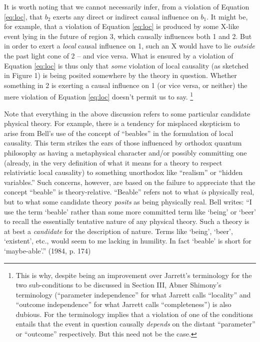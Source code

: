 \documentclass[aps,prc,twocolumn]{revtex4}
\begin{document}
It is worth noting that we cannot necessarily infer, from a violation
of Equation \ref{eq:loc}, that $b_2$ exerts any direct or indirect
causal influence on $b_1$.  It might be, for example,
that a violation of Equation \ref{eq:loc} is produced by some X-like
event lying in the future of region 3, which causally
influences both 1 and 2.  But in order to exert a \emph{local} causal
influence on 1, such an X would have to lie \emph{outside} the past light
cone of 2 -- and vice versa.  What is ensured by a violation of Equation
\ref{eq:loc} is thus only that \emph{some} violation of local
causality (as sketched in Figure 1) is being posited somewhere by the
theory in question.  Whether something in 2 is exerting a causal
influence on 1 (or vice versa, or neither) the mere violation of
Equation \ref{eq:loc} doesn't permit us to say.  
\footnote{This is why, despite being an improvement over Jarrett's
  terminology for the two sub-conditions to be discussed in Section
  III, Abner Shimony's terminology (``parameter independence'' for
  what Jarrett calls ``locality'' and ``outcome independence'' for
  what Jarrett calls ``completeness'') is also dubious.  For the
  terminology implies that a violation of one of the conditions
  entails that the event in question causally \emph{depends} on the distant
  ``parameter'' or ``outcome'' respectively.  But this need not be the
  case.}

Note that
everything in the above discussion refers to some particular candidate
physical theory.  For example, there is a tendency for misplaced
skepticism to arise from Bell's use of the concept of ``beables'' in 
the formulation of local causality.  This term strikes the ears of
those influenced by orthodox quantum philosophy as having a
metaphysical character and/or possibly committing one (already, in the
very definition of what it means for a theory to respect relativistic
local causality) to something unorthodox like ``realism'' or ``hidden
variables.''  Such concerns, however, are based on the failure to 
appreciate that
the concept ``beable'' is theory-relative.  ``Beable'' refers not to
what \emph{is} physically real, but to what some candidate theory
\emph{posits} as being physically real.  Bell writes:
``I use the term
`beable' rather than some more committed term like `being' or `beer'
to recall the essentially tentative nature of any physical theory.
Such a theory is at best a \emph{candidate} for the description of
nature.  Terms like `being', `beer', `existent', etc., would seem to
me lacking in humility.  In fact `beable' is short for `maybe-able'.''
(1984, p. 174)
\end{document}
